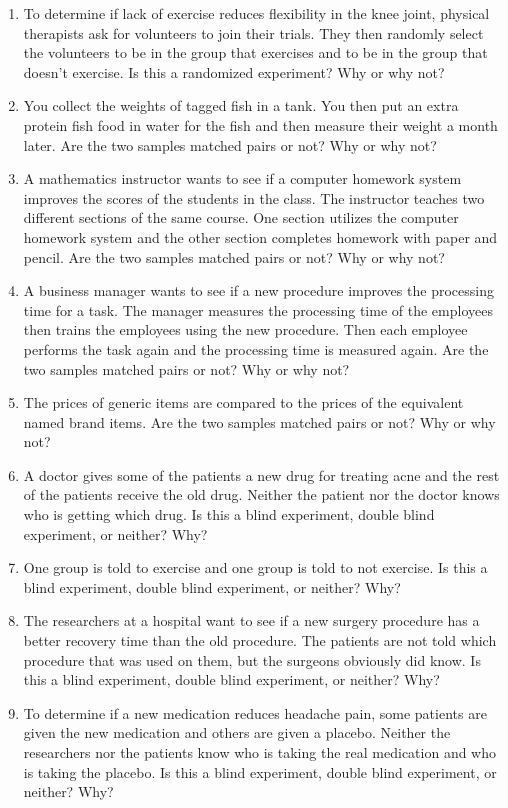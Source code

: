 \documentclass[]{book}
\begin{document}
\begin{enumerate}
\item
  To determine if lack of exercise reduces flexibility in the knee joint, physical therapists ask for volunteers to join their trials. They then randomly select the volunteers to be in the group that exercises and to be in the group that doesn't exercise. Is this a randomized experiment? Why or why not?
\item
  You collect the weights of tagged fish in a tank. You then put an extra protein fish food in water for the fish and then measure their weight a month later. Are the two samples matched pairs or not? Why or why not?
\item
  A mathematics instructor wants to see if a computer homework system improves the scores of the students in the class. The instructor teaches two different sections of the same course. One section utilizes the computer homework system and the other section completes homework with paper and pencil. Are the two samples matched pairs or not? Why or why not?
\item
  A business manager wants to see if a new procedure improves the processing time for a task. The manager measures the processing time of the employees then trains the employees using the new procedure. Then each employee performs the task again and the processing time is measured again. Are the two samples matched pairs or not? Why or why not?
\item
  The prices of generic items are compared to the prices of the equivalent named brand items. Are the two samples matched pairs or not? Why or why not?
\item
  A doctor gives some of the patients a new drug for treating acne and the rest of the patients receive the old drug. Neither the patient nor the doctor knows who is getting which drug. Is this a blind experiment, double blind experiment, or neither? Why?
\item
  One group is told to exercise and one group is told to not exercise. Is this a blind experiment, double blind experiment, or neither? Why?
\item
  The researchers at a hospital want to see if a new surgery procedure has a better recovery time than the old procedure. The patients are not told which procedure that was used on them, but the surgeons obviously did know. Is this a blind experiment, double blind experiment, or neither? Why?
\item
  To determine if a new medication reduces headache pain, some patients are given the new medication and others are given a placebo. Neither the researchers nor the patients know who is taking the real medication and who is taking the placebo. Is this a blind experiment, double blind experiment, or neither? Why?

\end{enumerate}
\end{document}
